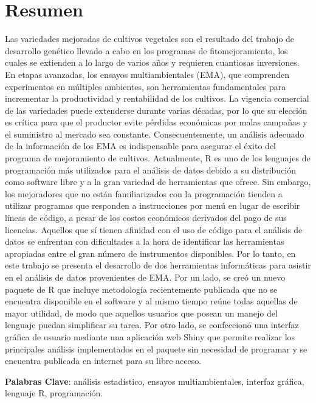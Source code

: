
\chapter*{Resumen}

Las variedades mejoradas de cultivos vegetales son el resultado del trabajo de desarrollo genético llevado a cabo en los programas de fitomejoramiento, los cuales se extienden a lo largo de varios años y requieren cuantiosas inversiones. En etapas avanzadas, los ensayos multiambientales (EMA), que comprenden experimentos en múltiples ambientes, son herramientas fundamentales para incrementar la productividad y rentabilidad de los cultivos. La vigencia comercial de las variedades puede extenderse durante varias décadas, por lo que su elección es crítica para que el productor evite pérdidas económicas por malas campañas y el suministro al mercado sea constante. Consecuentemente, un análisis adecuado de la información de los EMA es indispensable para asegurar el éxito del programa de mejoramiento de cultivos. Actualmente, R es uno de los lenguajes de programación más utilizados para el análisis de datos debido a su distribución como software libre y a la gran variedad de herramientas que ofrece. Sin embargo, los mejoradores que no están familiarizados con la programación tienden a utilizar programas que responden a instrucciones por menú en lugar de escribir líneas de código, a pesar de los costos económicos derivados del pago de sus licencias. Aquellos que sí tienen afinidad con el uso de código para el análisis de datos se enfrentan con dificultades a la hora de identificar las herramientas apropiadas entre el gran número de instrumentos disponibles. Por lo tanto, en este trabajo se presenta el desarrollo de dos herramientas informáticas para asistir en el análisis de datos provenientes de EMA. Por un lado, se creó un nuevo paquete de R que incluye metodología recientemente publicada que no se encuentra disponible en el software y al mismo tiempo reúne todas aquellas de mayor utilidad, de modo que aquellos usuarios que posean un manejo del lenguaje puedan simplificar su tarea. Por otro lado, se confeccionó una interfaz gráfica de usuario mediante una aplicación web Shiny que permite realizar los principales análisis implementados en el paquete sin necesidad de programar y se encuentra publicada en internet para su libre acceso.

\textbf{Palabras Clave}: análisis estadístico, ensayos multiambientales, interfaz gráfica, lenguaje R, programación.

